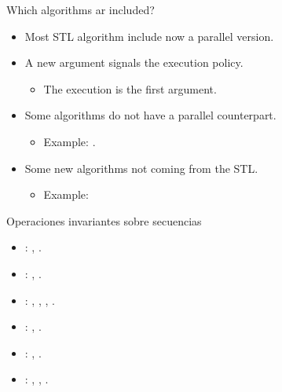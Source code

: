 \begin{frame}[t]{Which algorithms ar included?}
\begin{itemize}
  \item Most STL algorithm include now a parallel version.
  \item A new argument signals the execution policy.
    \begin{itemize}
      \item The execution is the first argument.
    \end{itemize}
  \item Some algorithms do not have a parallel counterpart.
    \begin{itemize}
      \item Example: .
    \end{itemize}
  \item Some new algorithms not coming from the STL.
    \begin{itemize}
      \item Example: 
    \end{itemize}
\end{itemize}
\end{frame}

\begin{frame}[t,allowframebreaks]{Operaciones invariantes sobre secuencias}
\begin{itemize}
  \item {}: 
    , 
    .

  \vfill
  \item {}: 
    , 
    .

  \vfill
  \item {}: 
    , 
    , 
    ,
    .

  \vfill
  \item {}:
    ,
    .

  \vfill
  \item {}: 
    ,
    .

  \vfill
  \item {}: 
    , 
    ,
    .
\end{itemize}
\end{frame}

